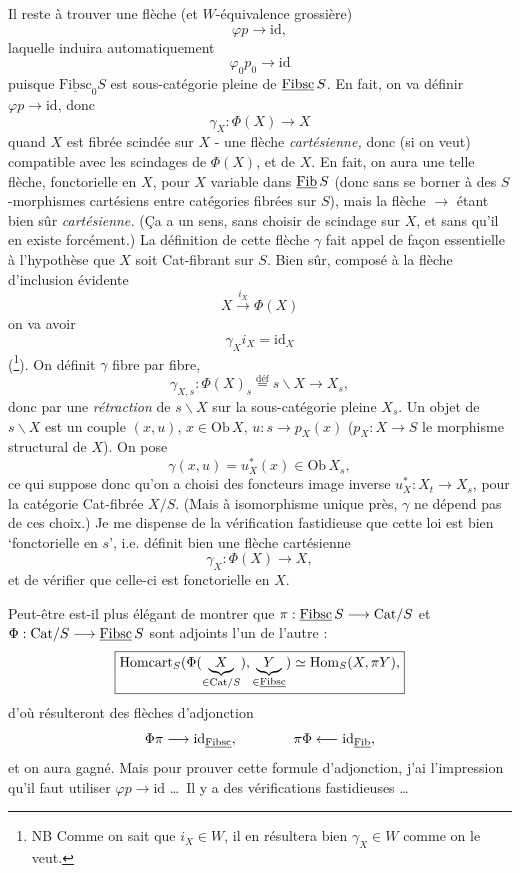 Il reste à trouver une flèche (et $W$-équivalence grossière)
\[\varphi p \longrightarrow \mathrm{id},\]
laquelle induira automatiquement
\[\varphi_0 p_0 \longrightarrow \mathrm{id}\]
puisque $\underline{\mathrm{Fibsc}}_0 S$ est sous-catégorie pleine de $\underline{\mathrm{Fibsc}}\,S$. En fait, on va définir $\varphi p \longrightarrow \mathrm{id}$, donc
\[\boxed{\gamma_X : \Phi(X) \longrightarrow X}\]
quand $X$ est fibrée scindée sur $X$ - une flèche \textit{cartésienne,} donc (si on veut) compatible avec les scindages de $\Phi(X)$, et de $X$. En fait, on aura une telle flèche, fonctorielle en $X$, pour $X$ variable dans $\underline{\mathrm{Fib}}\,S$ (donc sans se borner à des $S$-morphismes cartésiens entre catégories fibrées sur $S$), mais la flèche $\longrightarrow$ étant bien sûr \textit{cartésienne.} (Ça a un sens, sans choisir de scindage sur $X$, et sans qu'il en existe forcément.) La définition de cette flèche $\gamma$ fait appel de façon essentielle à l'hypothèse que $X$ soit Cat-fibrant sur $S$. Bien sûr, composé à la flèche d'inclusion évidente %
\[X \xrightarrow{i_X} \Phi(X)\]
on va avoir
\[\gamma_X i_X = \mathrm{id}_X\]
(\footnote[39]{NB Comme on sait que $i_X \in W$, il en résultera bien $\gamma_X \in W$ comme on le veut.}). On définit $\gamma$ fibre par fibre,
\[\gamma_{X,s} : \Phi(X)_s \overset{\text{déf}}{=} s\backslash X \longrightarrow X_s,\]
donc par une \textit{rétraction} de $s\backslash X$ sur la sous-catégorie pleine $X_s$. Un objet de $s\backslash X$ est un couple $(x,u)$, $x \in \mathrm{Ob}\, X$, $u : s \longrightarrow p_X(x)$ ($p_X : X \longrightarrow S$ le morphisme structural de $X$). On pose
\[\gamma(x,u) = u_X^*(x) \in \mathrm{Ob}\, X_s,\]
ce qui suppose donc qu'on a choisi des foncteurs image inverse $u_X^* : X_t \longrightarrow X_s$, pour la catégorie Cat-fibrée $X/S$. (Mais à isomorphisme unique près, $\gamma$ ne dépend pas de ces choix.) Je me dispense de la vérification fastidieuse que cette loi est bien ‘fonctorielle en $s$’, i.e. définit bien une flèche cartésienne
\[\gamma_X : \Phi(X) \longrightarrow X,\]
et de vérifier que celle-ci est fonctorielle en $X$.


Peut-être est-il plus élégant de montrer que $\pi : \underline{\mathrm{Fibsc}}\,S \longrightarrow \mathrm{Cat}/S$ et $\Phi : \mathrm{Cat}/S \longrightarrow \underline{\mathrm{Fibsc}}\,S$ sont adjoints l'un de l'autre :
\[\boxed{\mathrm{Homcart}_S(\Phi(\underbrace{\;X\;}_{\in\mathrm{Cat}/S}),\underbrace{\;Y\;}_{\in\underline{\mathrm{Fibsc}}}) \simeq \mathrm{Hom}_S(X,\pi Y),}\]
d'où résulteront des flèches d'adjonction
\[\Phi\pi \longrightarrow \mathrm{id}_{\underline{\mathrm{Fibsc}}}, \qquad\qquad \pi\Phi \longleftarrow \mathrm{id}_{\underline{\mathrm{Fib}}},\]
 et on aura gagné. Mais pour prouver cette formule d'adjonction, j'ai l'impression qu'il faut utiliser $\varphi p \longrightarrow \mathrm{id}$ \ldots\ Il y a des vérifications fastidieuses \ldots

